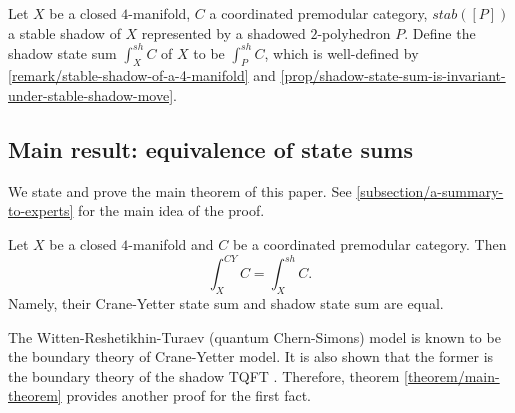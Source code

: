 
\begin{definition}\label{def/shadow-state-sum-of-a-4-manifold}
  Let $X$ be a closed $4$-manifold, $C$ a coordinated premodular
  category, $stab([P])$ a stable shadow of $X$ represented by a
  shadowed $2$-polyhedron $P$. Define the shadow state sum
  $\int_{X}^{sh} C$ of $X$ to be $\int_{P}^{sh} C$, which is
  well-defined by \ref{remark/stable-shadow-of-a-4-manifold} and
  \ref{prop/shadow-state-sum-is-invariant-under-stable-shadow-move}.
\end{definition}

\subsection{Main result: equivalence of state sums}

\noindent We state and prove the main theorem of this paper. See
\ref{subsection/a-summary-to-experts} for the main idea of the
proof.

\begin{theorem}\label{theorem/main-theorem}
  Let $X$ be a closed $4$-manifold and $C$ be a coordinated
  premodular category. Then
  $$\int^{CY}_{X}C = \int^{sh}_{X} C.$$
  Namely, their Crane-Yetter state sum and shadow state sum are
  equal.
\end{theorem}

\begin{remark}
  The Witten-Reshetikhin-Turaev (quantum Chern-Simons) model is
  known to be the boundary theory of Crane-Yetter model. It is
  also shown that the former is the boundary theory of the shadow
  TQFT \cite[X.3.2 \& theorem X.3.3]{turaev-qiok-3-manifolds}.
  Therefore, theorem \ref{theorem/main-theorem} provides another
  proof for the first fact.
\end{remark}

